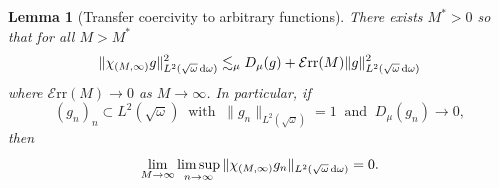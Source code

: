 \documentclass[reqno,11pt,letterpaper]{amsart}
\numberwithin{equation}{section}
\newcommand{\dd}{\, {\rm d}}
\newtheorem{lemma}[proposition]{Lemma}
\begin{document}
\begin{lemma}[Transfer coercivity to arbitrary functions] \label{lemm:transfer_coercivity}
    There exists $M^*>0$ so that for all $M>M^*$
    \begin{equation} \label{eq:lemm:transfer_coercivity1}
        \begin{split}
\|\chi_{(M,\infty)}g\|_{L^2(\sqrt{\omega}\dd\omega)}^2 \lesssim_\mu D_\mu(g) + \mathcal{E}\text{rr}(M)   \|g\|_{L^2(\sqrt{\omega}\dd\omega)}^2
        \end{split}
    \end{equation}
    where $\mathcal{E}\text{rr}(M)\to 0$ as $M\to \infty$. 
In particular, if $$(g_n)_n \subset L^2(\sqrt{\omega})\ \text{ with }\ \| g_n \|_{L^2(\sqrt{\omega})}=1 \ \text{ and }\ D_\mu(g_n) \to 0, $$ then 
$$\lim_{M\to\infty}
    \limsup_{n\to\infty} \| \chi_{(M,\infty)}g_n \|_{L^2(\sqrt{\omega}\dd\omega)} =0. $$
\end{lemma}
\end{document}
